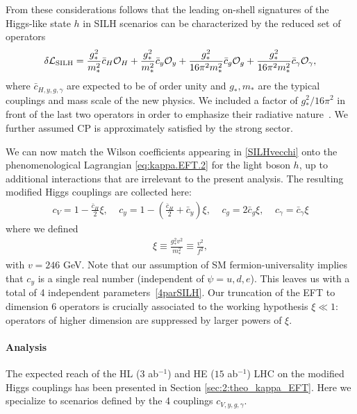 From these considerations follows that the leading on-shell signatures of the Higgs-like state $h$ in SILH scenarios can be characterized by the reduced set of operators 
\begin{eqnarray}\label{SILHvecchi}
\delta{\cal L}_{\rm SILH}=\frac{g_*^2}{m_*^2}\bar c_H{\cal O}_H+\frac{g_*^2}{m_*^2} \bar c_y{\cal O}_y+\frac{g_*^2}{16\pi^2m_*^2}\bar c_g{\cal O}_g+\frac{g_*^2}{16\pi^2m_*^2}\bar c_\gamma{\cal O}_\gamma,
\end{eqnarray}
where $\bar c_{H,y,g,\gamma}$ are expected to be of order unity and $g_*, m_*$ are the typical couplings and mass scale of the new physics. We included a factor of ${g_*^2}/{16\pi^2}$ in front of the last two operators in order to emphasize their radiative nature~\cite{Giudice:2007fh}. We further assumed CP is approximately satisfied by the strong sector.

We can now match the Wilson coefficients appearing in \eqref{SILHvecchi} onto the phenomenological Lagrangian \eqref{eq:kappa.EFT.2} for the light boson $h$, up to additional interactions that are irrelevant to the present analysis. The resulting modified Higgs couplings are collected here:
\begin{eqnarray}\label{4parSILH}
c_V=1-\frac{\bar c_H}{2}\xi,~~~~~c_y=1-\left(\frac{\bar c_H}{2}+\bar c_y\right)\xi,~~~~~c_g=2 \bar c_g\xi,~~~~~c_\gamma=\bar c_\gamma\xi
\end{eqnarray}
where we defined 
\begin{eqnarray}\label{xi}
\xi\equiv\frac{g_*^2v^2}{m_*^2}\equiv\frac{v^2}{f^2},
\end{eqnarray}
with $v=246$ GeV. Note that our assumption of SM fermion-universality implies that $c_y$ is a single real number (independent of $\psi=u,d,e$). This leaves us with a total of 4 independent parameters~\eqref{4parSILH}. Our truncation of the EFT to dimension 6 operators is crucially associated to the working hypothesis $\xi\ll1$: operators of higher dimension are suppressed by larger powers of $\xi$. 





\paragraph{Analysis}

The expected reach of the HL ($3$ ab$^{-1}$) and HE ($15$ ab$^{-1}$) LHC on the modified Higgs couplings has been presented in Section \ref{sec:2:theo_kappa_EFT}. Here we specialize to scenarios defined by the 4 couplings $c_{V,y,g,\gamma}$. 


